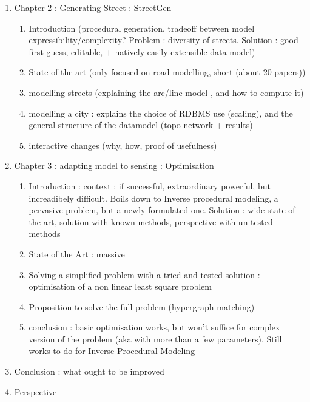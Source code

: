 \documentclass{article}
\begin{document}
\begin{enumerate}
 \item Chapter 2 : Generating Street : StreetGen
 	\begin{enumerate}
 	\item Introduction (procedural generation, tradeoff between model expressibility/complexity? Problem : diversity of streets. Solution : good first guess, editable, + natively easily extensible data model)
 	\item State of the art (only focused on road modelling, short (about 20 papers))
 	\item modelling streets (explaining the arc/line model , and how to compute it)
 	\item modelling a city : explains the choice of RDBMS use (scaling), and the general structure of the datamodel (topo network + results)
 	\item interactive changes (why, how, proof of usefulness)
 	\end{enumerate}
 	
 \item Chapter 3 : adapting model to sensing : Optimisation
 	\begin{enumerate}
 	\item Introduction : context : if successful, extraordinary powerful, but increadibely difficult. Boils down to Inverse procedural modeling, a pervasive problem, but a newly formulated one. Solution : wide state of the art, solution with known methods, perspective with un-tested methods
 	\item State of the Art : massive
 	\item Solving a simplified problem with a tried and tested solution : optimisation of a non linear least square problem
 	\item Proposition to solve the full problem (hypergraph matching)
 	\item conclusion : basic optimisation works, but won't suffice for complex version of the problem (aka with more than a few parameters). Still works to do for Inverse Procedural Modeling
 	\end{enumerate}
 	
 \item Conclusion : what ought to be improved
 \item Perspective
 \end{enumerate}
\end{document}
